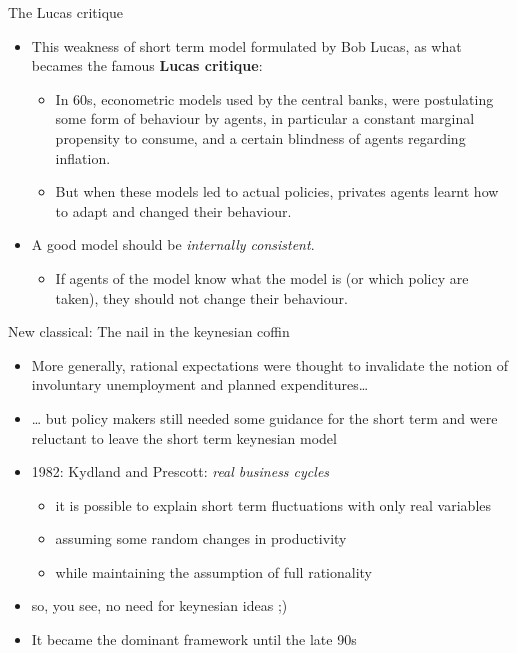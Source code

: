 \begin{frame}{The Lucas critique}
\protect\hypertarget{the-lucas-critique}{}
\begin{itemize}
\tightlist
\item
  This weakness of short term model formulated by Bob Lucas, as what
  becames the famous \textbf{Lucas critique}:

  \begin{itemize}
  \tightlist
  \item
    In 60s, econometric models used by the central banks, were
    postulating some form of behaviour by agents, in particular a
    constant marginal propensity to consume, and a certain blindness of
    agents regarding inflation.
  \item
    But when these models led to actual policies, privates agents learnt
    how to adapt and changed their behaviour.
  \end{itemize}
\item
  A good model should be \emph{internally consistent}.

  \begin{itemize}
  \tightlist
  \item
    If agents of the model know what the model is (or which policy are
    taken), they should not change their behaviour.
  \end{itemize}
\end{itemize}
\end{frame}

\begin{frame}{New classical: The nail in the keynesian coffin}
\protect\hypertarget{new-classical-the-nail-in-the-keynesian-coffin}{}
\begin{itemize}
\tightlist
\item
  More generally, rational expectations were thought to invalidate the
  notion of involuntary unemployment and planned expenditures\ldots{}
\item
  \ldots{} but policy makers still needed some guidance for the short
  term and were reluctant to leave the short term keynesian model
\item
  1982: Kydland and Prescott: \emph{real business cycles}

  \begin{itemize}
  \tightlist
  \item
    it is possible to explain short term fluctuations with only real
    variables
  \item
    assuming some random changes in productivity
  \item
    while maintaining the assumption of full rationality
  \end{itemize}
\item
  so, you see, no need for keynesian ideas ;)
\item
  It became the dominant framework until the late 90s
\end{itemize}
\end{frame}

